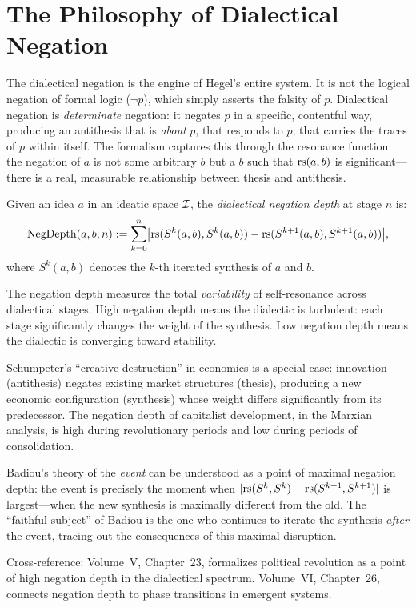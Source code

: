 
\section{The Philosophy of Dialectical Negation}
\label{sec:dialectical-negation-philosophy}

The dialectical negation is the engine of Hegel's entire system. It is not
the logical negation of formal logic ($\neg p$), which simply asserts the
falsity of $p$. Dialectical negation is \emph{determinate} negation: it negates
$p$ in a specific, contentful way, producing an antithesis that is \emph{about}
$p$, that responds to $p$, that carries the traces of $p$ within itself. The
formalism captures this through the resonance function: the negation of $a$ is
not some arbitrary $b$ but a $b$ such that $\mathrm{rs}(a, b)$ is significant---there
is a real, measurable relationship between thesis and antithesis.

\begin{definition}
\label{def:negation-depth}
Given an idea $a$ in an ideatic space $\mathcal{I}$, the \emph{dialectical negation
depth} at stage $n$ is:
\[
\mathrm{NegDepth}(a, b, n) := \sum_{k=0}^{n} \bigl|\mathrm{rs}(S^k(a,b), S^k(a,b)) -
\mathrm{rs}(S^{k+1}(a,b), S^{k+1}(a,b))\bigr|,
\]
where $S^k(a,b)$ denotes the $k$-th iterated synthesis of $a$ and $b$.
\end{definition}

\begin{interpretation}
The negation depth measures the total \emph{variability} of self-resonance
across dialectical stages. High negation depth means the dialectic is turbulent:
each stage significantly changes the weight of the synthesis. Low negation depth
means the dialectic is converging toward stability.

Schumpeter's ``creative destruction'' in economics is a special case:
innovation (antithesis) negates existing market structures (thesis), producing
a new economic configuration (synthesis) whose weight differs significantly from
its predecessor. The negation depth of capitalist development, in the Marxian
analysis, is high during revolutionary periods and low during periods of
consolidation.

Badiou's theory of the \emph{event} can be understood as a point of maximal
negation depth: the event is precisely the moment when $|\mathrm{rs}(S^k, S^k) -
\mathrm{rs}(S^{k+1}, S^{k+1})|$ is largest---when the new synthesis is maximally
different from the old. The ``faithful subject'' of Badiou is the one who
continues to iterate the synthesis \emph{after} the event, tracing out the
consequences of this maximal disruption.

Cross-reference: Volume~V, Chapter~23, formalizes political revolution as a
point of high negation depth in the dialectical spectrum. Volume~VI, Chapter~26,
connects negation depth to phase transitions in emergent systems.
\end{interpretation}


